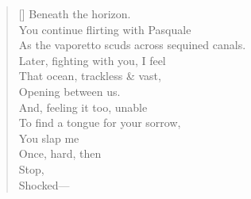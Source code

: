 \begin{verse}[\versewidth]
Beneath the horizon.\\
You continue flirting with Pasquale\\
As the vaporetto scuds across sequined canals.\\
Later, fighting with you, I feel\\
That ocean, trackless \& vast,\\
Opening between us.\\
And, feeling it too, unable\\
To find a tongue for your sorrow,\\
You slap me\\
Once, hard, then\\
Stop,\\
             Shocked---
\end{verse}
